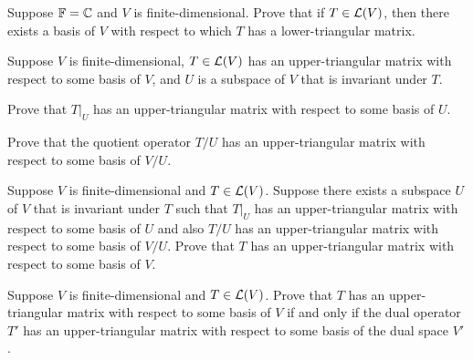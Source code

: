 \begin{exc}
\begin{exercise}
Suppose $\mathbb{F}=\mathbb{C}$ and $V$ is finite-dimensional. Prove that if $T\in\mathcal{L}(V)$, then
there exists a basis of $V$ with respect to which $T$ has a lower-triangular
matrix.
\end{exercise}

\begin{exercise}
Suppose $V$ is finite-dimensional, $T\in\mathcal{L}(V)$ has an upper-triangular matrix
with respect to some basis of $V$, and $U$ is a subspace of $V$ that is invariant
under $T$.
\begin{parts}
\item Prove that $T|_U$ has an upper-triangular matrix with respect to some basis
  of $U$.
\item Prove that the quotient operator $T/U$ has an upper-triangular matrix with
  respect to some basis of $V/U$.
\end{parts}
\end{exercise}

\begin{exercise}
Suppose $V$ is finite-dimensional and $T\in\mathcal{L}(V)$. Suppose there exists a
subspace $U$ of $V$ that is invariant under $T$ such that $T|_U$ has an
upper-triangular matrix with respect to some basis of $U$ and also $T/U$ has an
upper-triangular matrix with respect to some basis of $V/U$. Prove that $T$ has
an upper-triangular matrix with respect to some basis of $V$.
\end{exercise}

\begin{exercise}
Suppose $V$ is finite-dimensional and $T\in\mathcal{L}(V)$. Prove that $T$ has an
upper-triangular matrix with respect to some basis of $V$ if and only if the dual
operator $T'$ has an upper-triangular matrix with respect to some basis of the
dual space $V'$.
\end{exercise}
\end{exc}
